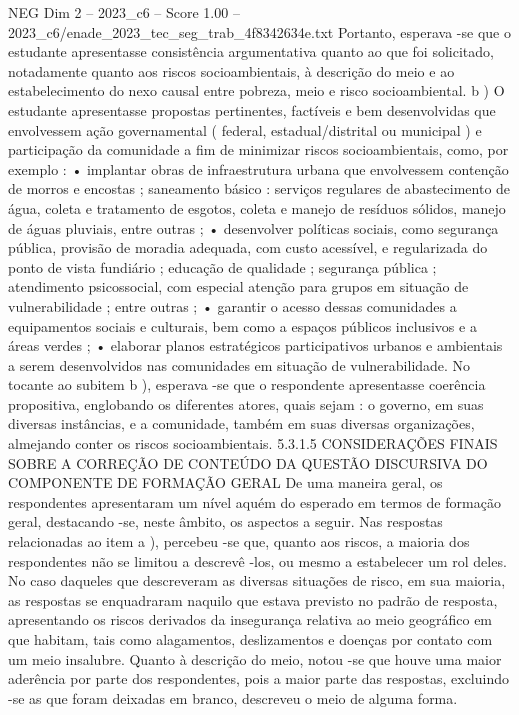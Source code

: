\begin{textsample}{NEG Dim 2 – 2023\_c6 – Score 1.00 – 2023\_c6/enade\_2023\_tec\_seg\_trab\_4f8342634e.txt}
Portanto, esperava -se que o estudante apresentasse consistência argumentativa quanto ao que foi solicitado, notadamente quanto aos riscos socioambientais, à descrição do meio e ao estabelecimento do nexo causal entre pobreza, meio e risco socioambiental. b ) O estudante apresentasse propostas pertinentes, factíveis e bem desenvolvidas que envolvessem ação governamental ( federal, estadual/distrital ou municipal ) e participação da comunidade a fim de minimizar riscos socioambientais, como, por exemplo : • implantar obras de infraestrutura urbana que envolvessem contenção de morros e encostas ; saneamento básico : serviços regulares de abastecimento de água, coleta e tratamento de esgotos, coleta e manejo de resíduos sólidos, manejo de águas pluviais, entre outras ; • desenvolver políticas sociais, como segurança pública, provisão de moradia adequada, com custo acessível, e regularizada do ponto de vista fundiário ; educação de qualidade ; segurança pública ; atendimento psicossocial, com especial atenção para grupos em situação de vulnerabilidade ; entre outras ; • garantir o acesso dessas comunidades a equipamentos sociais e culturais, bem como a espaços públicos inclusivos e a áreas verdes ; • elaborar planos estratégicos participativos urbanos e ambientais a serem desenvolvidos nas comunidades em situação de vulnerabilidade.
No tocante ao subitem b ), esperava -se que o respondente apresentasse coerência propositiva, englobando os diferentes atores, quais sejam : o governo, em suas diversas instâncias, e a comunidade, também em suas diversas organizações, almejando conter os riscos socioambientais. 5.3.1.5 CONSIDERAÇÕES FINAIS SOBRE A CORREÇÃO DE CONTEÚDO DA QUESTÃO DISCURSIVA DO COMPONENTE DE FORMAÇÃO GERAL De uma maneira geral, os respondentes apresentaram um nível aquém do esperado em termos de formação geral, destacando -se, neste âmbito, os aspectos a seguir.
Nas respostas relacionadas ao item a ), percebeu -se que, quanto aos riscos, a maioria dos respondentes não se limitou a descrevê -los, ou mesmo a estabelecer um rol deles.
No caso daqueles que descreveram as diversas situações de risco, em sua maioria, as respostas se enquadraram naquilo que estava previsto no padrão de resposta, apresentando os riscos derivados da insegurança relativa ao meio geográfico em que habitam, tais como alagamentos, deslizamentos e doenças por contato com um meio insalubre.
Quanto à descrição do meio, notou -se que houve uma maior aderência por parte dos respondentes, pois a maior parte das respostas, excluindo -se as que foram deixadas em branco, descreveu o meio de alguma forma.

\end{textsample}
